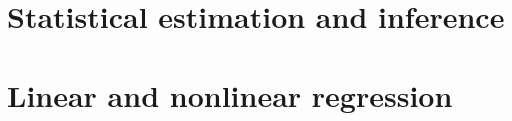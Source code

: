 \documentclass[12pt,notitlepage]{report}
\begin{document}
\chapter{Statistical estimation and inference}



\newcommand*\FancyVerbStartString{## block}




\chapter{Linear and nonlinear regression}










\end{document}
